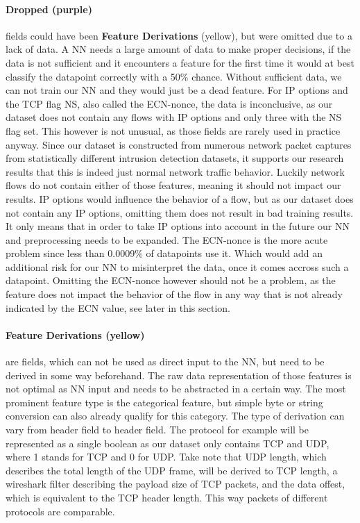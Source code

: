 \documentclass[
	ngerman,
	ruledheaders=section,%
	class=report,%
	thesis={type=bachelor},%
	accentcolor=9c,%
	custommargins=true,%
	marginpar=false,%
	parskip=half-,%
	fontsize=11pt,%
]{tudapub}
\begin{document}
\paragraph{\colorbox{dropped}{\textbf{Dropped} (purple)}} fields could have been \colorbox{derivation}{\textbf{Feature Derivations} (yellow)}, but were omitted due to a lack of data.
A NN needs a large amount of data to make proper decisions, if the data is not sufficient and it encounters a feature for the first time it would at best classify the datapoint correctly with a 50\% chance.
Without sufficient data, we can not train our NN and they would just be a dead feature.
For IP options and the TCP flag NS, also called the ECN-nonce, the data is inconclusive,
as our dataset does not contain any flows with IP options and only three with the NS flag set.
This however is not unusual, as those fields are rarely used in practice anyway.
Since our dataset is constructed from numerous network packet captures from statistically different intrusion detection datasets,
it supports our research results that this is indeed just normal network traffic behavior.
Luckily network flows do not contain either of those features, meaning it should not impact our results.
IP options would influence the behavior of a flow, but as our dataset does not contain any IP options, omitting them does not result in bad training results.
It only means that in order to take IP options into account in the future our NN and preprocessing needs to be expanded.
The ECN-nonce is the more acute problem since less than 0.0009\% of datapoints use it.
Which would add an additional risk for our NN to misinterpret the data, once it comes accross such a datapoint.
Omitting the ECN-nonce however should not be a problem, as the feature does not impact the behavior of the flow in any way that is not already indicated by the ECN value, see later in this section.

\paragraph{\colorbox{derivation}{\textbf{Feature Derivations} (yellow)}} are fields, which can not be used as direct input to the NN,
but need to be derived in some way beforehand.
The raw data representation of those features is not optimal as NN input and needs to be abstracted in a certain way.
The most prominent feature type is the categorical feature, but simple byte or string conversion can also already qualify for this category.
The type of derivation can vary from header field to header field.
The protocol for example will be represented as a single boolean as our dataset only contains TCP and UDP, where 1 stands for TCP and 0 for UDP.
Take note that UDP length, which describes the total length of the UDP frame, will be derived to TCP length, a wireshark filter describing the payload size of TCP packets, and the data offest, which is equivalent to the TCP header length.
This way packets of different protocols are comparable.
\end{document}
